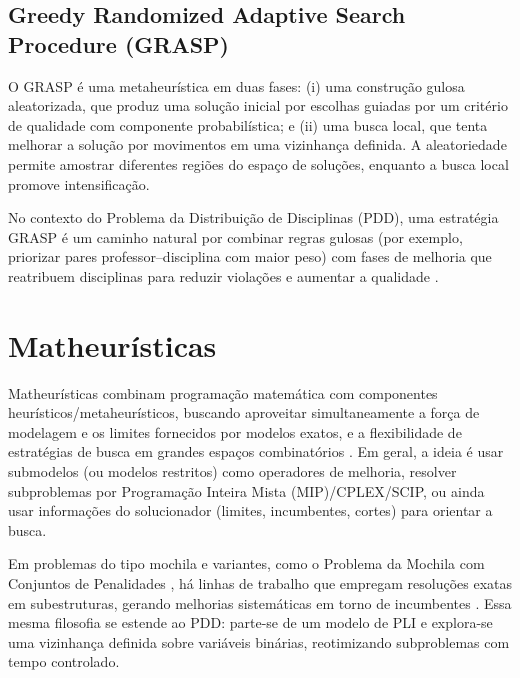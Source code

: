 \subsection{Greedy Randomized Adaptive Search Procedure (GRASP)}

O GRASP é uma metaheurística em duas fases: (i) uma construção gulosa aleatorizada, que produz uma solução inicial por escolhas guiadas por um critério de qualidade com componente probabilística; e (ii) uma busca local, que tenta melhorar a solução por movimentos em uma vizinhança definida. A aleatoriedade permite amostrar diferentes regiões do espaço de soluções, enquanto a busca local promove intensificação.

No contexto do Problema da Distribuição de Disciplinas (PDD), uma estratégia GRASP é um caminho natural por combinar regras gulosas (por exemplo, priorizar pares professor--disciplina com maior peso) com fases de melhoria que reatribuem disciplinas para reduzir violações e aumentar a qualidade \cite{jhonatan_grasp_dpd}.

\section{Matheurísticas}

Matheurísticas combinam programação matemática com componentes heurísticos/metaheurísticos, buscando aproveitar simultaneamente a força de modelagem e os limites fornecidos por modelos exatos, e a flexibilidade de estratégias de busca em grandes espaços combinatórios \cite{ball_2011,boschetti_letchford_maniezzo_2023,maniezzo_stutzle_voss_2021}. Em geral, a ideia é usar submodelos (ou modelos restritos) como operadores de melhoria, resolver subproblemas por Programação Inteira Mista (MIP)/CPLEX/SCIP, ou ainda usar informações do solucionador (limites, incumbentes, cortes) para orientar a busca.

Em problemas do tipo mochila e variantes, como o Problema da 
Mochila com Conjuntos de Penalidades \cite{dambrosio_laureana_raiconi_vitale_2023}, 
há linhas de trabalho que empregam resoluções exatas em 
subestruturas, gerando melhorias sistemáticas em torno de 
incumbentes \cite{jovanovic_voss_2024,silva2024matheuristica_mochila}. Essa mesma filosofia se estende ao PDD: parte-se de um modelo de PLI e explora-se uma vizinhança definida sobre variáveis binárias, reotimizando subproblemas com tempo controlado.

